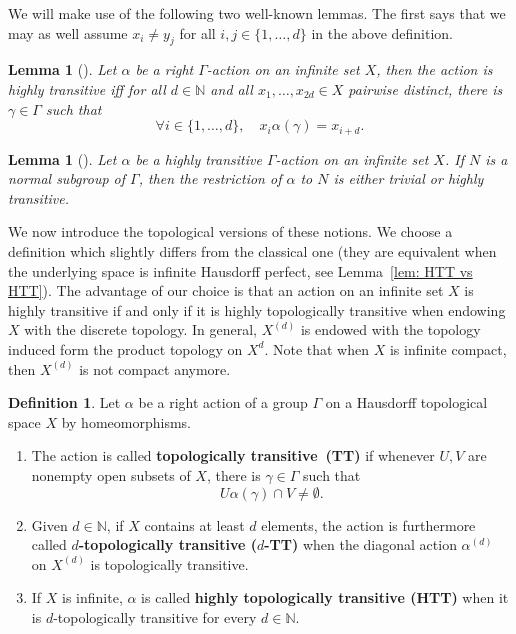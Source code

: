 \documentclass[12pt]{article}
\numberwithin{equation}{section}
\newtheorem{lemma}[equation]{Lemma}
\theoremstyle{definition}
\newtheorem{definition}[equation]{Definition}
\def\defin#1{\textbf{#1}}
\newcommand{\N}{\mathbb{N}}
\begin{document}
We will make use of the following two well-known lemmas. The first says that we may as well 
assume \(x_i\neq y_j\) for all \(i,j\in\{1,\dots,d\}\) in the above definition.
\begin{lemma}[{\cite[Lem.~2.2]{fima_characterization_HT_2022}}]
	\label{lem: ht with all distinct}
	Let \( \alpha \) be a right \( \Gamma \)-action on an infinite set \(X\),
	then the action is highly transitive iff for all \(d\in\N\) 
	and all \(x_1,\dots,x_{2d}\in X\) pairwise distinct, 
	there is \( \gamma\in\Gamma \) such that 
	\[
	\forall i\in\{1,\dots,d\}, \quad x_i \alpha(\gamma)=x_{i+d}.
	\]
\end{lemma}


\begin{lemma}[{\cite[Lem.~1.4(2)]{moonHighlyTransitiveActions2013}}]
	\label{lem: ht passes to normal subgroups}
	Let \( \alpha \) be a highly transitive \( \Gamma \)-action on an infinite set \(X\).
	If $N$ is a normal subgroup of \( \Gamma \), then the restriction of \( \alpha \) to \(N\) is either 
	trivial or highly transitive.
\end{lemma}

We now introduce the topological versions of these notions. 
We choose a definition which slightly differs from the classical one
(they are equivalent when the underlying space is infinite Hausdorff perfect, see Lemma~\ref{lem: HTT vs HTT}).
The advantage of our choice is that an action on an infinite set \(X\)
is highly transitive if and only if it is highly topologically transitive when endowing
\(X\) with the discrete topology. 
In general,  
    	\(X^{(d)}\) is endowed with the topology induced form the product topology on \(X^{d}\).
Note that when \(X\)
is infinite compact, then \(X^{(d)}\) is not compact anymore.


\begin{definition}
    \label{def: htt action}
	    	    Let $\alpha$ be a  right action of a group \( \Gamma \) on a Hausdorff topological space \(X\)
    	by homeomorphisms.
    	
    	
    	\begin{enumerate}
    	\item 
The action is called \defin{topologically transitive~(TT)}
    	if whenever \(U, V\) are nonempty open subsets of \(X\), 
    	there is \(\gamma\in\Gamma\) such that \[ U\alpha(\gamma)\cap V\neq \emptyset.\]
    	
    	\item Given \(d\in\N\), if \(X\) contains at least \(d\) elements, the action is furthermore called \defin{\(d\)-topologically transitive (\(d\)-TT)} when the diagonal action 
    	\(\alpha^{(d)}\) on \(X^{(d)}\) is topologically transitive.
    	    
	    \item If \(X\) is infinite, \( \alpha \) is called \defin{highly topologically transitive (HTT)}
    	when it is \(d\)-topologically transitive for every \(d\in\N\). 
    	\end{enumerate}
\end{definition}
\end{document}
